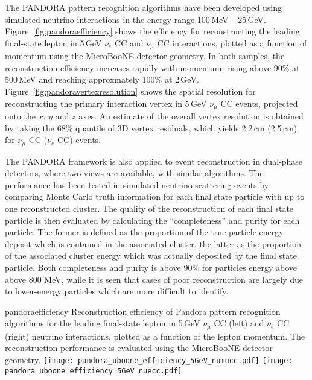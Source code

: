The PANDORA pattern recognition algorithms have been developed
using simulated neutrino interactions in the energy range 100\,MeV\,$-$\,25\,GeV.
Figure~\ref{fig:pandoraefficiency} shows the efficiency for reconstructing
the leading final-state lepton in 5\,GeV $\nu_{e}$ CC and $\nu_{\mu}$ CC interactions,
plotted as a function of momentum using the MicroBooNE detector geometry.
In both samples, the reconstruction efficiency increases rapidly with momentum,
rising above 90\% at 500\,MeV and reaching approxmately 100\% at 2\,GeV.
Figure~\ref{fig:pandoravertexresolution} shows the spatial resolution for
reconstructing the primary interaction vertex in 5\,GeV $\nu_{\mu}$ CC events,
projected onto the $x$, $y$ and $z$ axes. An estimate of the overall vertex 
resolution is obtained by taking the 68\% quantile of 3D vertex residuals, 
which yields 2.2\,cm (2.5\,cm) for $\nu_{\mu}$ CC ($\nu_{e}$ CC) events.


The PANDORA framework is also applied to event reconstruction in
dual-phase detectors, where two views are available, with similar
algorithms.  The performance has been tested in simulated neutrino scattering events
by comparing Monte Carlo truth information for each 
final state particle with up to one
reconstructed cluster.  The quality of the reconstruction of each
final state particle is then evaluated by calculating the
``completeness'' and purity for each particle.  The former is defined
as the proportion of the true particle energy deposit which is
contained in the associated cluster, the latter as the proportion of
the associated cluster energy which was actually deposited by the
final state particle.  Both completeness and purity is above 90$\%$
for particles energy above above 800 MeV, while it is seen that cases
of poor reconstruction are largely due to lower-energy particles which
are more difficult to identify.


\begin{cdrfigure}{pandoraefficiency}
{Reconstruction efficiency of Pandora pattern recognition algorithms
 for the leading final-state lepton in 5\,GeV $\nu_{\mu}$ CC (left) and
 $\nu_{e}$ CC (right) neutrino interactions, plotted as a function of
 the lepton momentum. The reconstruction performance is evaluated
 using the MicroBooNE detector geometry. }
\texttt{[image: pandora\_uboone\_efficiency\_5GeV\_numucc.pdf]}
\texttt{[image: pandora\_uboone\_efficiency\_5GeV\_nuecc.pdf]}
\end{cdrfigure}

